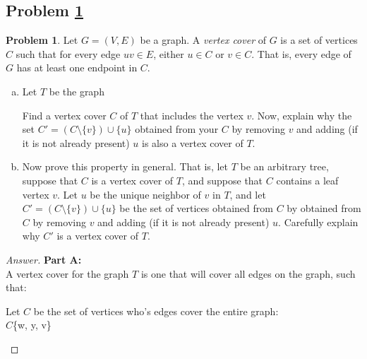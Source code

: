 \documentclass[11pt]{article}
\theoremstyle{definition}
\theoremstyle{definition}
\newtheorem{required}{Problem}
\theoremstyle{definition}
\begin{document}
\subsection{Problem \ref{Exchange2}}
\begin{required} \label{Exchange2}
Let $G=(V, E)$ be a graph. A \emph{vertex cover} of $G$ is a set of vertices $C$ such that for every edge $uv \in E$, either $u \in C$ or $v \in C$. That is, every edge of $G$ has at least one endpoint in $C$. 

\begin{enumerate}[(a)]
    \item Let $T$ be the graph
    \begin{center}
    \end{center}
    Find a vertex cover $C$ of $T$ that includes the vertex $v$. 
    Now, explain why the set $C' = (C \setminus \{v\}) \cup \{u\}$ obtained from your $C$ by removing $v$ and adding (if it is not already present) $u$ is also a vertex cover of $T$.
    \item Now prove this property in general. That is, let $T$ be an arbitrary tree, suppose that $C$ is a vertex cover of $T$, and suppose that $C$ contains a leaf vertex $v$. 
    Let $u$ be the unique neighbor of $v$ in $T$, and let $C' = (C \setminus \{v\}) \cup \{u\}$ be the set of vertices obtained from $C$ by obtained from $C$ by removing $v$ and adding (if it is not already present) $u$. Carefully explain why $C'$ is a vertex cover of $T$.
\end{enumerate}

\begin{proof}[Answer] 
\textbf{Part A:}\\
A vertex cover for the graph $T$ is one that will cover all edges on the graph, such that:
\begin{center}
Let $C$ be the set of vertices who's edges cover the entire graph: \\
$C$\{w, y, v\} \\
\end{center}


\end{proof}
\end{required}
\end{document}
